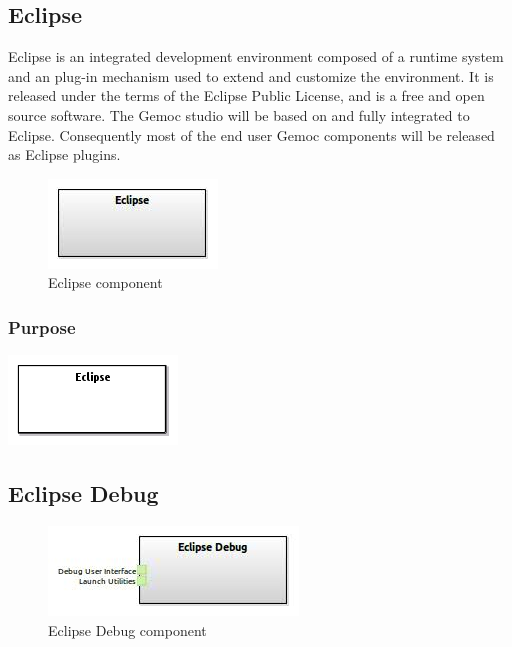 \documentclass{gemoc} %
\begin{document}
\subsection{Eclipse}
Eclipse is an integrated development environment composed of a runtime system and an plug-in mechanism used to extend and customize the environment. It is released under the terms of the Eclipse Public License, and is a free and open source software. The Gemoc studio will be based on and fully integrated to Eclipse. Consequently most of the end user Gemoc components will be released as Eclipse plugins.
\begin{figure}[htp]
	\begin{center}
	\includegraphics*[trim=0.0cm 0.0cm 0cm 0.0cm, clip=true, scale=1.0]{../images/generated/Generated_Eclipse.jpg}
	\caption{Eclipse component}
	\end{center}
\end{figure}

\subsubsection{Purpose}

\begin{center}
\includegraphics*[trim=0.0cm 0.0cm 0cm 0.0cm, clip=true]{../images/generated/Generated_Eclipse.png}
\end{center}



\subsection{Eclipse Debug}

\begin{figure}[htp]
	\begin{center}
	\includegraphics*[trim=0.0cm 0.0cm 0cm 0.0cm, clip=true, scale=1.0]{../images/generated/Generated_Eclipse Debug.jpg}
	\caption{Eclipse Debug component}
	\end{center}
\end{figure}
\end{document}
